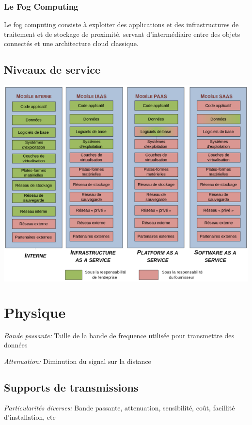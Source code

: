\documentclass[a4paper, 12pt, french]{article}
\begin{document}
	\subsubsection{Le Fog Computing}

	Le fog computing consiste à exploiter des applications et des infrastructures de traitement et de stockage de proximité, servant d'intermédiaire entre des objets connectés et une architecture cloud classique.

	\subsection{Niveaux de service}

	\includegraphics[width=13.8cm]{reseau_niveaux_de_service}

	\section{Physique}

	\emph{Bande passante:} Taille de la bande de frequence utilisée pour transmettre des données

	\emph{Attenuation: } Diminution du signal sur la distance

	\subsection{Supports de transmissions}

	\emph{Particularités diverses: } Bande passante, attenuation, sensibilité, coût, facillité d'installation, etc
\end{document}
